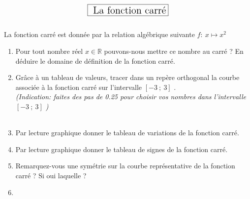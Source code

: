 \documentclass[a4paper,10pt]{article}
\newtheorem{defi}{Définition}
\newcommand{\R}{\mathbb{R}}
\begin{document}
	\lhead{}\chead{}\rhead{}\renewcommand{\headrulewidth}{0pt}\renewcommand{\footrulewidth}{0.4pt}
	$$\fbox{\text{\Large{ La fonction carré}}}$$
	\hfil\\
	
	\noindent La fonction carré est donnée par la relation algébrique suivante \quad
	$f:~x \longmapsto x^2$\\
	\begin{enumerate}
		\item Pour tout nombre réel $x\in\R$ pouvons-nous mettre ce nombre au carré ? En déduire le domaine de définition de la fonction carré. \\
		\item Grâce à un tableau de valeurs, tracer dans un repère orthogonal la courbe associée à la fonction carré sur l'intervalle $[-3~;~3]$ .\\
		\textit{(Indication: faites des pas de 0.25 pour choisir vos nombres dans l'intervalle $[-3~;~3]$ )}\\ 
		
		\noindent{}
		\hfill\\[-0.5cm]
		
		\item Par lecture graphique donner le tableau de variations de la fonction carré.\\   
		\item Par lecture graphique donner le tableau de signes de la fonction carré.\\
		\item Remarquez-vous une symétrie sur la courbe représentative de la fonction carré ? Si oui laquelle ?\\
		\item
\end{enumerate}
\end{document}
